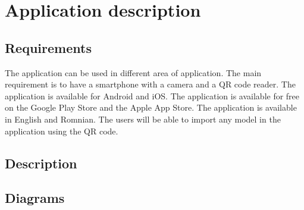 \chapter{Application description}\label{chapter:appdescription}


\section{Requirements}
The application can be used in different area of application. The main requirement is to have a smartphone with a camera and a QR code reader. The application is available for Android and iOS. The application is available for free on the Google Play Store and the Apple App Store. The application is available in English and Romnian. The users will be able to import any model in the application using the QR code.

\section{Description}
\pagebreak
\section{Diagrams}
